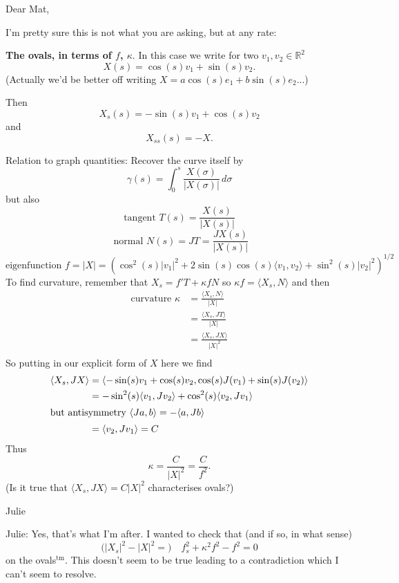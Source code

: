 \documentclass[12pt, a4paper]{amsart}
\newcommand{\bigR}{{\mathbb R}}
\theoremstyle{remark}
\begin{document}
  




\title{  }

Dear Mat,

I'm pretty sure this is not what you are asking, but at any rate:

\textbf{The ovals, in terms of $f$, $\kappa$}.
In this case we write for two $v_1,v_2\in\bigR^2$
$$X(s)=\cos(s) v_1+\sin(s) v_2. $$
(Actually we'd be better off writing $X=a\cos(s) e_1 + b\sin(s) e_2$...)

Then
$$X_s(s)=-\sin(s)v_1+\cos(s)v_2$$
and
$$X_{ss}(s)=-X.$$

Relation to graph quantities:  Recover the curve itself by
$$\gamma(s)=\int_0^s \frac{X(\sigma)}{|X(\sigma)|}\,d\sigma$$
but also
$$\text{tangent }   T(s)=\frac{X(s)}{|X(s)|}$$
$$\text{ normal  }   N(s)=JT =\frac{JX(s)}{|X(s)|}$$
$$ \text{eigenfunction } f=|X| = \left( \cos^2(s) |v_1|^2 + 2\sin(s)\cos(s)\langle v_1,v_2\rangle + \sin^2(s)|v_2|^2\right)^{1/2}  $$
To find curvature, remember that $X_s=f'T+ \kappa f N$ so $\kappa f=\langle X_s,N\rangle$ and then
\begin{align*}
\text{curvature } \kappa&=\frac{\langle X_s,N\rangle}{|X|}\\
&=\frac{\langle X_s,JT\rangle}{|X|}\\
&=\frac{\langle X_s,JX\rangle}{|X|^2}\\
\end{align*}
So putting in our explicit form of $X$ here we find
\begin{align*}
{\langle X_s,JX\rangle}&=\langle -\sin(s)v_1+\cos(s)v_2, \cos(s) J(v_1) +\sin(s) J(v_2)\rangle \\
&=-\sin^2(s)\langle  v_1,J v_2\rangle + \cos^2(s)\langle v_2,Jv_1\rangle \\
\intertext{but antisymmetry $\langle Ja,b\rangle = -\langle a,Jb\rangle$ }
&= \langle v_2,Jv_1\rangle =C
\end{align*}
Thus 
$$\kappa=\frac{C}{|X|^2}= \frac{C}{f^2}.$$
(Is it true that $\langle X_s, JX\rangle=C|X|^2$ characterises ovals?)


Julie
\bigskip

Julie: Yes, that's what I'm after. I wanted to check that (and if so, in what sense)
\[
\Big(|X_s|^2-|X|^2=\Big)\quad f_s^2+\kappa^2 f^2-f^2=0
\]
on the ovals$^{\mathrm{tm}}$. This doesn't seem to be true leading to a contradiction which I can't seem to resolve.
\end{document}
